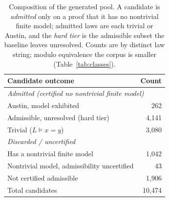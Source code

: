%


\begin{table}[t]
\centering
\small
\begin{tabular}{lr}
\toprule
Candidate outcome & Count \\
\midrule
\multicolumn{2}{l}{\emph{Admitted (certified no nontrivial finite model)}} \\
\quad Austin, model exhibited          & 262 \\
\quad Admissible, unresolved (hard tier) & 4{,}141 \\
\quad Trivial ($L \models x{=}y$)      & 3{,}080 \\
\midrule
\multicolumn{2}{l}{\emph{Discarded / uncertified}} \\
\quad Has a nontrivial finite model    & 1{,}042 \\
\quad Nontrivial model, admissibility uncertified & 43 \\
\quad Not certified admissible         & 1{,}906 \\
\midrule
Total candidates                       & 10{,}474 \\
\bottomrule
\end{tabular}
\caption{Composition of the generated pool. A candidate is \emph{admitted} only on a
proof that it has no nontrivial finite model; admitted laws are each trivial or Austin,
and the \emph{hard tier} is the admissible subset the baseline leaves unresolved.
Counts are by distinct law string; modulo equivalence the corpus is smaller
(Table~\ref{tab:classes}).}
\label{tab:corpus}
\end{table}


